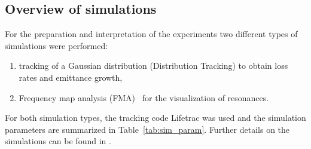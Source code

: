 \documentclass[%
 reprint,
 amsmath,amssymb,
 aps,
prstab,
]{revtex4-1}
\begin{document}
\subsection{Overview of simulations\label{sec:sim}}
For the preparation and interpretation of the experiments two different types of simulations were performed:
\begin{enumerate}
	\item tracking of a Gaussian distribution (Distribution Tracking) to obtain loss rates and emittance growth,
	\item Frequency map analysis (FMA)~\cite{fmalaskar} for the visualization of resonances.
\end{enumerate}
For both simulation types, the tracking code Lifetrac \cite{lifetrac} was used and the simulation parameters are summarized in Table~\ref{tab:sim_param}. Further details on the simulations can be found in \cite{md_sim_hel_res_ex_fitterer,md_sim_hel_res_ex_fitterer_update}.
\end{document}
